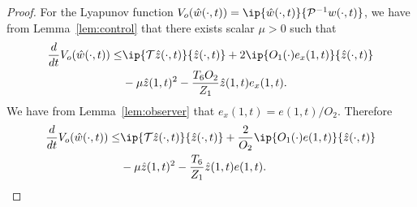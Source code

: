 \documentclass[US letter, 9 pt, conference]{ieeeconf}  \usepackage{setspace}
\newcommand{\wh}{\hat{w}}
\newcommand{\mcl}[1]{\mathcal{#1}}
\newcommand{\pinv}{\mathcal{P}^{-1}}
\newcommand{\zh}{\hat{z}}
\begin{document}
\begin{proof}
For the Lyapunov function $V_o(\wh(\cdot,t))=\ip{\wh(\cdot,t)}{\pinv w(\cdot,t)}$, we have from Lemma~\ref{lem:control} that there exists  scalar $\mu>0$ such that
\begin{align*}
\frac{d}{dt}V_o(\wh(\cdot,t)) \leq & \ip{\mcl{T}\zh(\cdot,t)}{\zh(\cdot,t)}+2 \ip{O_1(\cdot)e_x(1,t)}{\zh(\cdot,t)} \\
& -\mu \zh(1,t)^2 -\frac{T_6 O_2}{Z_1}\zh(1,t)e_x(1,t).
\end{align*} We have from Lemma~\ref{lem:observer} that $e_x(1,t)=e(1,t)/O_2$. Therefore
\begin{align}
\frac{d}{dt}V_o(\wh(\cdot,t)) \leq & \ip{\mcl{T}\zh(\cdot,t)}{\zh(\cdot,t)}+\frac{2}{O_2} \ip{O_1(\cdot)e(1,t)}{\zh(\cdot,t)} \nonumber \\
&\label{eqn:coupled:Vobs} -\mu \zh(1,t)^2 -\frac{T_6 }{Z_1}\zh(1,t)e(1,t).
\end{align}


\end{proof}
\end{document}
